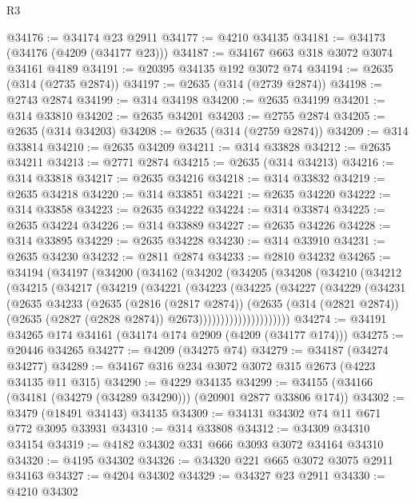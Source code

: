 \begin{lexlean}{R3}
\begin{coremodule}
@34176 := @34174 @23 @2911
@34177 := @4210 @34135
@34181 := @34173 (@34176 (@4209 (@34177 @23)))
@34187 := @34167 @663 @318 @3072 @3074 @34161 @4189
@34191 := @20395 @34135 @192 @3072 @74
@34194 := @2635 (@314 (@2735 @2874))
@34197 := @2635 (@314 (@2739 @2874))
@34198 := @2743 @2874
@34199 := @314 @34198
@34200 := @2635 @34199
@34201 := @314 @33810
@34202 := @2635 @34201
@34203 := @2755 @2874
@34205 := @2635 (@314 @34203)
@34208 := @2635 (@314 (@2759 @2874))
@34209 := @314 @33814
@34210 := @2635 @34209
@34211 := @314 @33828
@34212 := @2635 @34211
@34213 := @2771 @2874
@34215 := @2635 (@314 @34213)
@34216 := @314 @33818
@34217 := @2635 @34216
@34218 := @314 @33832
@34219 := @2635 @34218
@34220 := @314 @33851
@34221 := @2635 @34220
@34222 := @314 @33858
@34223 := @2635 @34222
@34224 := @314 @33874
@34225 := @2635 @34224
@34226 := @314 @33889
@34227 := @2635 @34226
@34228 := @314 @33895
@34229 := @2635 @34228
@34230 := @314 @33910
@34231 := @2635 @34230
@34232 := @2811 @2874
@34233 := @2810 @34232
@34265 := @34194
    (@34197
      (@34200
        (@34162
          (@34202
            (@34205
              (@34208
                (@34210
                  (@34212
                    (@34215
                      (@34217
                        (@34219
                          (@34221
                            (@34223
                              (@34225
                                (@34227
                                  (@34229
                                    (@34231
                                      (@2635
                                        @34233
                                        (@2635
                                          (@2816 (@2817 @2874))
                                          (@2635
                                            (@314 (@2821 @2874))
                                            (@2635 (@2827 (@2828 @2874)) @2673)))))))))))))))))))))
@34274 := @34191 @34265 @174 @34161 (@34174 @174 @2909 (@4209 (@34177 @174)))
@34275 := @20446 @34265
@34277 := @4209 (@34275 @74)
@34279 := @34187 (@34274 @34277)
@34289 := @34167 @316 @234 @3072 @3072 @315 @2673 (@4223 @34135 @11 @315)
@34290 := @4229 @34135
@34299 := @34155 (@34166 (@34181 (@34279 (@34289 @34290))) (@20901 @2877 @33806 @174))
@34302 := @3479 (@18491 @34143) @34135
@34309 := @34131 @34302 @74 @11 @671 @772 @3095 @33931
@34310 := @314 @33808
@34312 := @34309 @34310 @34154
@34319 := @4182 @34302 @331 @666 @3093 @3072 @34164 @34310
@34320 := @4195 @34302
@34326 := @34320 @221 @665 @3072 @3075 @2911 @34163
@34327 := @4204 @34302
@34329 := @34327 @23 @2911
@34330 := @4210 @34302

\end{coremodule}
\end{lexlean}
